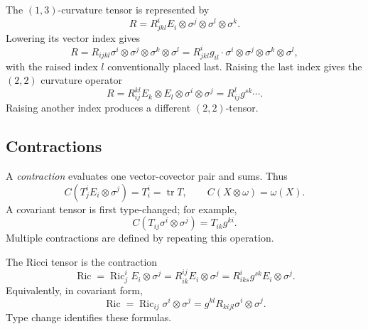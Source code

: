 \begin{notation}
  \label{def:pet-ch1-curvature-types}


  The $(1,3)$-curvature tensor is represented by
  \[
    R=R^i_{jkl}E_i\otimes\sigma^j\otimes\sigma^l\otimes\sigma^k.
  \]
  Lowering its vector index gives
  \[
    R=R_{ijkl}\sigma^i\otimes\sigma^j\otimes\sigma^k\otimes\sigma^l
      =R^i_{jkl}g_{il}\cdot
        \sigma^i\otimes\sigma^j\otimes\sigma^k\otimes\sigma^l,
  \]
  with the raised index $l$ conventionally placed last. Raising the last index
  gives the $(2,2)$ curvature operator
  \[
    R=R^{kl}_{ij}E_k\otimes E_l\otimes\sigma^i\otimes\sigma^j
      =R^l_{ij}g^{sk}\cdots.
  \]
  Raising another index produces a different $(2,2)$-tensor.
\end{notation}

\subsection{Contractions}

\begin{definition}[Contraction]
  \label{def:pet-ch1-contraction}


  A \emph{contraction} evaluates one vector-covector pair and sums. Thus
  \[
    C(T^i_jE_i\otimes\sigma^j)=T^i_i=\operatorname{tr}T,
    \qquad C(X\otimes\omega)=\omega(X).
  \]
  A covariant tensor is first type-changed; for example,
  \[
    C(T_{ij}\sigma^i\otimes\sigma^j)=T_{ik}g^{ki}.
  \]
  Multiple contractions are defined by repeating this operation.
\end{definition}

\begin{remark}
  \label{rem:pet-ch1-ricci-contraction}


  The Ricci tensor is the contraction
  \[
    \operatorname{Ric}
      =\operatorname{Ric}^i_jE_i\otimes\sigma^j
      =R^{ij}_{ik}E_i\otimes\sigma^j
      =R^i_{iks}g^{sk}E_i\otimes\sigma^j.
  \]
  Equivalently, in covariant form,
  \[
    \operatorname{Ric}
      =\operatorname{Ric}_{ij}\sigma^i\otimes\sigma^j
      =g^{kl}R_{kijl}\sigma^i\otimes\sigma^j.
  \]
  Type change identifies these formulas.
\end{remark}

